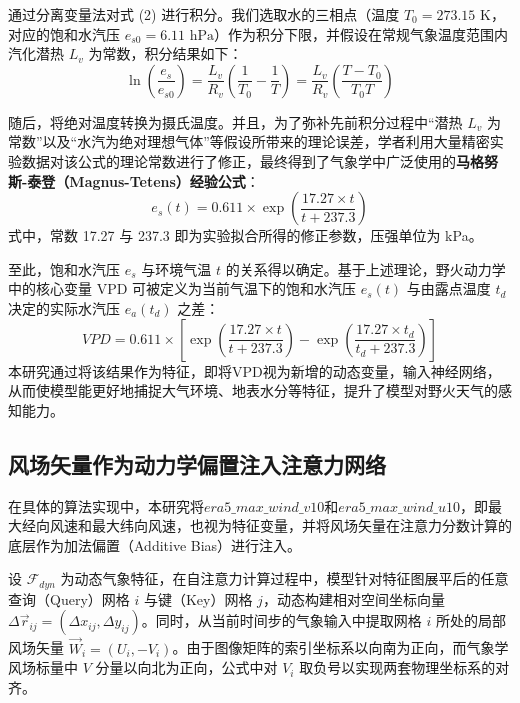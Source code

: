 通过分离变量法对式 (2) 进行积分。我们选取水的三相点（温度 $T_0 = 273.15 \text{ K}$，对应的饱和水汽压 $e_{s0} = 6.11 \text{ hPa}$）作为积分下限，并假设在常规气象温度范围内汽化潜热 $L_v$ 为常数，积分结果如下：
\begin{equation}
    \ln\left(\frac{e_s}{e_{s0}}\right) = \frac{L_v}{R_v} \left( \frac{1}{T_0} - \frac{1}{T} \right) = \frac{L_v}{R_v} \left( \frac{T - T_0}{T_0 T} \right)
\end{equation}

随后，将绝对温度转换为摄氏温度。并且，为了弥补先前积分过程中“潜热 $L_v$ 为常数”以及“水汽为绝对理想气体”等假设所带来的理论误差，学者利用大量精密实验数据对该公式的理论常数进行了修正，最终得到了气象学中广泛使用的\textbf{马格努斯-泰登（Magnus-Tetens）经验公式}\cite{murray1967computation}：
\begin{equation}
    e_s(t) = 0.611 \times \exp\left(\frac{17.27 \times t}{t + 237.3}\right)
\end{equation}
式中，常数 17.27 与 237.3 即为实验拟合所得的修正参数，压强单位为 kPa。

至此，饱和水汽压 $e_s$ 与环境气温 $t$ 的关系得以确定。基于上述理论，野火动力学中的核心变量 VPD 可被定义为当前气温下的饱和水汽压 $e_s(t)$ 与由露点温度 $t_d$ 决定的实际水汽压 $e_a(t_d)$ 之差：
\begin{equation}
    VPD = 0.611 \times \left[ \exp\left(\frac{17.27 \times t}{t + 237.3}\right) - \exp\left(\frac{17.27 \times t_d}{t_d + 237.3}\right) \right]
\end{equation}
本研究通过将该结果作为特征，即将VPD视为新增的动态变量，输入神经网络，从而使模型能更好地捕捉大气环境、地表水分等特征，提升了模型对野火天气的感知能力。

\subsection{风场矢量作为动力学偏置注入注意力网络}
\label{sec:3-5-2}

在具体的算法实现中，本研究将$era5\_max\_wind\_v10$和$era5\_max\_wind\_u10$，即最大经向风速和最大纬向风速，也视为特征变量，并将风场矢量在注意力分数计算的底层作为加法偏置（Additive Bias）进行注入。

设 $\mathcal{F}_{dyn}$ 为动态气象特征，在自注意力计算过程中，模型针对特征图展平后的任意查询（Query）网格 $i$ 与键（Key）网格 $j$，动态构建相对空间坐标向量 $\Delta \vec{r}_{ij} = (\Delta x_{ij}, \Delta y_{ij})$。同时，从当前时间步的气象输入中提取网格 $i$ 所处的局部风场矢量 $\vec{W}_i = (U_i, -V_i)$。由于图像矩阵的索引坐标系以向南为正向，而气象学风场标量中 $V$ 分量以向北为正向，公式中对 $V_i$ 取负号以实现两套物理坐标系的对齐。


